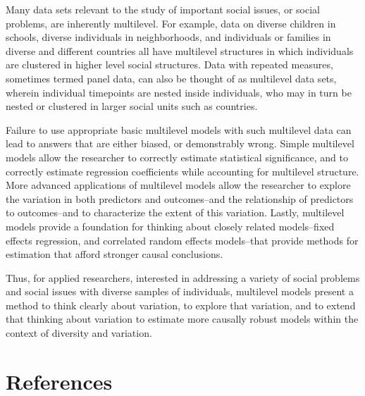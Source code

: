 \documentclass[
  letterpaper,
  DIV=11,
  numbers=noendperiod]{scrreprt}
\begin{document}
Many data sets relevant to the study of important social issues, or
social problems, are inherently multilevel. For example, data on diverse
children in schools, diverse individuals in neighborhoods, and
individuals or families in diverse and different countries all have
multilevel structures in which individuals are clustered in higher level
social structures. Data with repeated measures, sometimes termed panel
data, can also be thought of as multilevel data sets, wherein individual
timepoints are nested inside individuals, who may in turn be nested or
clustered in larger social units such as countries.

Failure to use appropriate basic multilevel models with such multilevel
data can lead to answers that are either biased, or demonstrably wrong.
Simple multilevel models allow the researcher to correctly estimate
statistical significance, and to correctly estimate regression
coefficients while accounting for multilevel structure.
 More advanced applications of multilevel models
allow the researcher to explore the variation in both predictors and
outcomes--and the relationship of predictors to outcomes--and to
characterize the extent of this variation. Lastly, multilevel models
provide a foundation for thinking about closely related models--fixed
effects regression, and correlated random effects models--that provide
methods for estimation that afford stronger causal conclusions.

Thus, for applied researchers, interested in addressing a variety of
social problems and social issues with diverse samples of individuals,
multilevel models present a method to think clearly about variation, to
explore that variation, and to extend that thinking about variation to
estimate more causally robust models within the context of diversity and
variation. 


\chapter*{References}\label{references}

\end{document}
